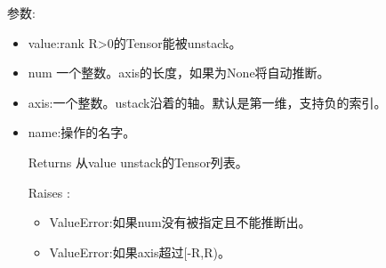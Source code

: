 参数:
\begin{itemize}
\item value:rank R>0的Tensor能被unstack。
\item num 一个整数。axis的长度，如果为None将自动推断。
\item axis:一个整数。ustack沿着的轴。默认是第一维，支持负的索引。
\item name:操作的名字。
\item[Returns] 从value unstack的Tensor列表。
\item[Raises]:
\begin{itemize}
\item ValueError:如果num没有被指定且不能推断出。
\item ValueError:如果axis超过[-R,R)。
\end{itemize}
\end{itemize}
